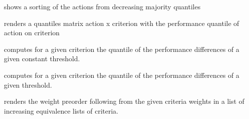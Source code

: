 \documentclass[letterpaper,10pt,english]{sphinxmanual}
\begin{document}
\begin{fulllineitems}
\begin{fulllineitems}
\end{fulllineitems}


\begin{fulllineitems}
\label{techDoc:perfTabs.PerformanceTableau.computeQuantileSort}
shows a sorting of the actions from decreasing majority quantiles

\end{fulllineitems}


\begin{fulllineitems}
\label{techDoc:perfTabs.PerformanceTableau.computeQuantiles}
renders a quantiles matrix action x criterion with the performance quantile of action on criterion

\end{fulllineitems}


\begin{fulllineitems}
\label{techDoc:perfTabs.PerformanceTableau.computeThresholdPercentile}
computes for a given criterion the quantile
of the performance differences of a given constant threshold.

\end{fulllineitems}


\begin{fulllineitems}
\label{techDoc:perfTabs.PerformanceTableau.computeVariableThresholdPercentile}
computes for a given criterion the quantile
of the performance differences of a given threshold.

\end{fulllineitems}


\begin{fulllineitems}
\label{techDoc:perfTabs.PerformanceTableau.computeWeightPreorder}
renders the weight preorder following from the given
criteria weights in a list of increasing equivalence
lists of criteria.


\end{fulllineitems}
\end{fulllineitems}
\end{document}
